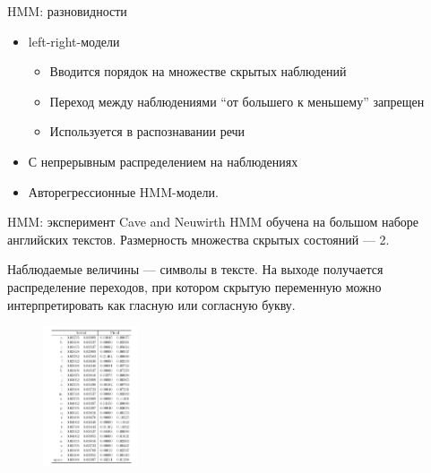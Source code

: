 \begin{frame}{HMM: разновидности}
\begin{itemize}
\item left-right-модели
\begin{itemize}
\item Вводится порядок на множестве скрытых наблюдений
\item Переход между наблюдениями ``от большего к меньшему'' запрещен
\item Используется в распознавании речи
\end{itemize}

\item С непрерывным распределением на наблюдениях

\item Авторегрессионные HMM-модели.
\end{itemize}
\end{frame}


\begin{frame}{HMM: эксперимент Cave and Neuwirth}
HMM обучена на большом наборе английских текстов. 
Размерность множества скрытых состояний --- 2. 

Наблюдаемые величины --- символы в тексте.
На выходе получается распределение переходов, при котором скрытую переменную можно интерпретировать как гласную или согласную букву.

\begin{figure}
\centering
\includegraphics[width=0.25\textwidth]{brown.png}
\end{figure}
\end{frame}

\iffalse

